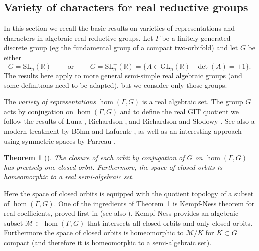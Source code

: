 \documentclass[a4paper,11pt]{article}
\newtheorem{Theorem}{Theorem}[section]
\begin{document}
\subsection{Variety of characters for real reductive groups}
\label{Section:real characters}
 
In this section we recall the basic results on varieties of representations and characters in 
algebraic real reductive groups. 
Let $\Gamma$ be a finitely generated discrete group (eg the fundamental group of a compact 
two-orbifold) and  
let $G$ be either
$$
G=\mathrm{SL}_n(\mathbb R ) \qquad \textrm{ or }
\qquad
G=\mathrm{SL}^{\pm}_n(\mathbb R )
 =\{A\in\textrm{GL}_n(\mathbb R)\mid \det (A)=\pm 1\}.
$$
The results here apply to more general
semi-simple real algebraic groups (and some definitions need to be adapted), but we consider only those groups. 




The \emph{variety of representations} $\hom( \Gamma, G )$ is a real algebraic set.
The group $G$ acts by conjugation 
on  $\hom( \Gamma, G )$
and to define the  real GIT quotient we follow the results
of   Luna \cite{Luna}, Richardson \cite{RichardsonDuke},
and 
Richardson and Slodowy \cite{RichardsonSlodowy}.
See also a modern treatment by 
B\"ohm and Lafuente \cite{BohmLafuente}, as well as 
an interesting approach using symmetric spaces by Parreau
\cite{Parreau}. 




\begin{Theorem}[\cite{Luna,  RichardsonSlodowy}]
\label{Thm:semialgebraic}
 The closure of each orbit by conjugation 
 of $G$ on $\hom( \Gamma, G )$ 
 has precisely one closed orbit. 
%
 Furthermore, the space  of closed orbits is homeomorphic to a real semi-algebraic set.
\end{Theorem}


Here the space of closed orbits is equipped with the quotient topology of
a subset of $\hom( \Gamma, G )$.
One of the ingredients of Theorem~\ref{Thm:semialgebraic}
is Kempf-Ness theorem for real coefficients, proved first in \cite{RichardsonSlodowy}
(see also \cite{BohmLafuente}). Kempf-Ness
 provides an algebraic subset $\mathcal M\subset \hom( \Gamma, G )$ that intersects all closed orbits
and only closed orbits. Furthermore the space of closed orbits is homeomorphic to $\mathcal M/K$
for $K\subset G$ compact (and therefore it is homeomorphic to a semi-algebraic
set).
\end{document}
